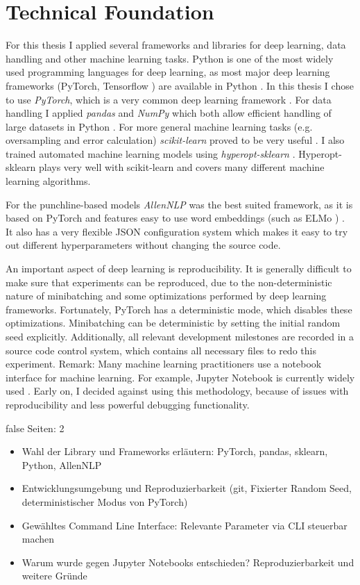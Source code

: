 \documentclass[draft,final,oneside]{vutinfth} %
\begin{document}
\section{Technical Foundation}

For this thesis I applied several frameworks and libraries for deep learning, data handling and other machine learning tasks. Python is one of the most widely used programming languages for deep learning, as most major deep learning frameworks (PyTorch, Tensorflow \cite{pytorch}\cite{tensorflow}) are available in Python \cite{python}. In this thesis I chose to use \textit{PyTorch}, which is a very common deep learning framework \cite{pytorch}. For data handling I applied \textit{pandas} and \textit{NumPy} which both allow efficient handling of large datasets in Python \cite{pandas}\cite{numpy}. For more general machine learning tasks (e.g. oversampling and error calculation) \textit{scikit-learn} proved to be very useful \cite{sklearn}. I also trained automated machine learning models using \textit{hyperopt-sklearn} \cite{hyperoptpaper}. Hyperopt-sklearn plays very well with scikit-learn and covers many different machine learning algorithms.


For the punchline-based models \textit{AllenNLP} was the best suited framework, as it is based on PyTorch and features easy to use word embeddings (such as ELMo \cite{elmo}) \cite{allennlp}. It also has a very flexible JSON configuration system which makes it easy to try out different hyperparameters without changing the source code.

An important aspect of deep learning is reproducibility. It is generally difficult to make sure that experiments can be reproduced, due to the non-deterministic nature of minibatching and some optimizations performed by deep learning frameworks. Fortunately, PyTorch has a deterministic mode, which disables these optimizations. Minibatching can be deterministic by setting the initial random seed explicitly. Additionally, all relevant development milestones are recorded in a source code control system, which contains all necessary files to redo this experiment. Remark: Many machine learning practitioners use a notebook interface for machine learning. For example, Jupyter Notebook is currently widely used \cite{jupyter}. Early on, I decided against using this methodology, because of issues with reproducibility and less powerful debugging functionality.

\if false
Seiten: 2

\begin{itemize}

\item Wahl der Library und Frameworks erläutern: PyTorch, pandas, sklearn, Python, AllenNLP
\item Entwicklungsumgebung und Reproduzierbarkeit (git, Fixierter Random Seed, deterministischer Modus von PyTorch)
\item Gewähltes Command Line Interface: Relevante Parameter via CLI steuerbar machen
\item Warum wurde gegen Jupyter Notebooks entschieden? Reproduzierbarkeit und weitere Gründe

\end{itemize}
\end{document}
